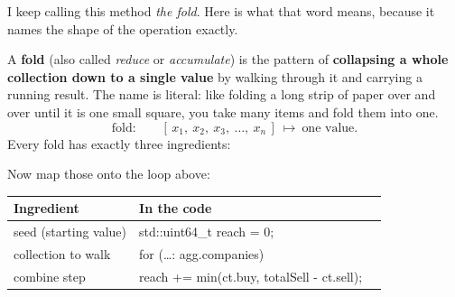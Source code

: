 I keep calling this method \emph{the fold}. Here is what that word means, because
it names the shape of the operation exactly.

A \textbf{fold} (also called \emph{reduce} or \emph{accumulate}) is the pattern of
\textbf{collapsing a whole collection down to a single value} by walking through it
and carrying a running result. The name is literal: like folding a long strip of
paper over and over until it is one small square, you take many items and fold
them into one.
\[
\text{fold:}\qquad [\,x_1,\ x_2,\ x_3,\ \dots,\ x_n\,]\ \longmapsto\ \text{one value}.
\]
Every fold has exactly three ingredients:

\begin{center}
\end{center}

Now map those onto the loop above:

\begin{center}
\renewcommand{\arraystretch}{1.3}\footnotesize
\begin{tabular}{@{}lll@{}}
\toprule
\textbf{Ingredient} & \textbf{In the code} & \\
\midrule
seed (starting value) & \ttfamily std::uint64\_t reach = 0; & \\
collection to walk & \ttfamily for (\dots : agg.companies) & \\
combine step & \ttfamily reach += min(ct.buy, totalSell - ct.sell); & \\
\bottomrule
\end{tabular}
\end{center}

